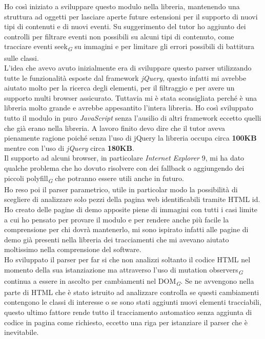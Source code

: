 \documentclass[a4paper, 12pt, twoside, openright]{book}
\newcommand{\gloss}[1]{#1\textsubscript{\textit{\tiny{G}}}}
\begin{document}
Ho così iniziato a sviluppare questo modulo nella libreria, mantenendo una struttura ad oggetti per lasciare aperte future estensioni per il supporto di nuovi tipi di contenuti e di nuovi eventi. Su suggerimento del tutor ho aggiunto dei controlli per filtrare eventi non possibili su alcuni tipi di contenuto, come tracciare eventi \gloss{seek} su immagini e per limitare gli errori possibili di battitura sulle classi.\\
L'idea che avevo avuto inizialmente era di sviluppare questo parser utilizzando tutte le funzionalità esposte dal framework \textit{jQuery}, questo infatti mi avrebbe aiutato molto per la ricerca degli elementi, per il filtraggio e per avere un supporto multi browser assicurato. Tuttavia mi è stata sconsigliata perché è una libreria molto grande e avrebbe appesantito l'intera libreria. Ho così sviluppato tutto il modulo in puro \textit{JavaScript} senza l'ausilio di altri framework eccetto quelli che già erano nella libreria. A lavoro finito devo dire che il tutor aveva pienamente ragione poiché senza l'uso di jQuery la libreria occupa circa \textbf{100KB} mentre con l'uso di \textit{jQuery} circa \textbf{180KB}.\\

Il supporto ad alcuni browser, in particolare \textit{Internet Explorer} 9, mi ha dato qualche problema che ho dovuto risolvere con dei fallback o aggiungendo dei piccoli \gloss{polyfill} che potranno essere utili anche in futuro.\\
Ho reso poi il parser parametrico, utile in particolar modo la possibilità di scegliere di analizzare solo pezzi della pagina web identificabili tramite HTML id.\\
Ho creato delle pagine di demo apposite piene di immagini con tutti i casi limite a cui ho pensato per provare il modulo e per rendere anche più facile la comprensione per chi dovrà mantenerlo, mi sono ispirato infatti alle pagine di demo già presenti nella libreria dei tracciamenti che mi avevano aiutato moltissimo nella comprensione del software.\\
Ho sviluppato il parser per far si che non analizzi soltanto il codice HTML nel momento della sua istanziazione ma attraverso l'uso di \gloss{mutation observers} continua a essere in ascolto per cambiamenti nel \gloss{DOM}. Se ne avvengono nella parte di HTML che è stato istruito ad analizzare controlla se questi cambiamenti contengono le classi di interesse o se sono stati aggiunti nuovi elementi tracciabili, questo ultimo fattore rende tutto il tracciamento automatico senza aggiunta di codice in pagina come richiesto, eccetto una riga per istanziare il parser che è inevitabile.\\
\end{document}
